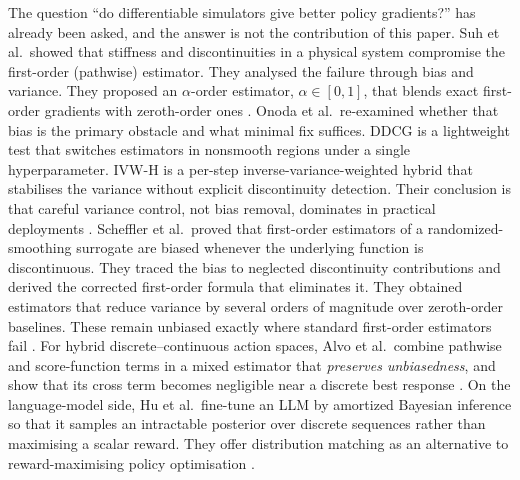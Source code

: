 The question ``do differentiable simulators give better policy gradients?'' has
already been asked, and the answer is not the contribution of this paper.
Suh et al.\ showed that stiffness and discontinuities in a physical system
compromise the first-order (pathwise) estimator.  They analysed the failure through
bias and variance.  They proposed an $\alpha$-order estimator, $\alpha\in[0,1]$,
that blends exact first-order gradients with zeroth-order ones
\cite{suh2022diffsim}.  Onoda et al.\ re-examined whether that bias is the
primary obstacle and what minimal fix suffices.  DDCG is a lightweight test that
switches estimators in nonsmooth regions under a single hyperparameter.  IVW-H is a
per-step inverse-variance-weighted hybrid that stabilises the variance without
explicit discontinuity detection.  Their conclusion is that careful
variance control, not bias removal, dominates in practical deployments
\cite{onoda2026ddcg}.  Scheffler et al.\ proved that first-order estimators of a
randomized-smoothing surrogate are biased whenever the underlying function is
discontinuous.  They traced the bias to neglected discontinuity contributions and
derived the corrected first-order formula that eliminates it.  They obtained
estimators that reduce variance by several orders of magnitude over zeroth-order
baselines.  These remain unbiased exactly where standard first-order estimators fail
\cite{scheffler2026cfobg,montaut2022collision}.  For hybrid
discrete--continuous action spaces, Alvo et al.\ combine pathwise and
score-function terms in a mixed estimator that \emph{preserves unbiasedness},
and show that its cross term becomes negligible near a discrete best response
\cite{hpo2026}.  On the language-model side, Hu et al.\ fine-tune an LLM by
amortized Bayesian inference so that it samples an intractable posterior over
discrete sequences rather than maximising a scalar reward.  They offer
distribution matching as an alternative to reward-maximising policy optimisation
\cite{hu2023abs}.

